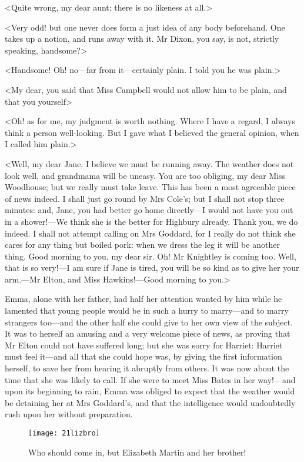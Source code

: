 <Quite wrong, my dear aunt; there is no likeness at all.>

<Very odd! but one never does form a just idea of any body beforehand. One takes up a notion, and runs away with it. Mr Dixon, you say, is not, strictly speaking, handsome?>

<Handsome! Oh! no—far from it—certainly plain. I told you he was plain.>

<My dear, you said that Miss Campbell would not allow him to be plain, and that you yourself\longdash>

<Oh! as for me, my judgment is worth nothing. Where I have a regard, I always think a person well-looking. But I gave what I believed the general opinion, when I called him plain.>

<Well, my dear Jane, I believe we must be running away. The weather does not look well, and grandmama will be uneasy. You are too obliging, my dear Miss Woodhouse; but we really must take leave. This has been a most agreeable piece of news indeed. I shall just go round by Mrs Cole's; but I shall not stop three minutes: and, Jane, you had better go home directly—I would not have you out in a shower!—We think she is the better for Highbury already. Thank you, we do indeed. I shall not attempt calling on Mrs Goddard, for I really do not think she cares for any thing but boiled pork: when we dress the leg it will be another thing. Good morning to you, my dear sir. Oh! Mr Knightley is coming too. Well, that is so very!—I am sure if Jane is tired, you will be so kind as to give her your arm.—Mr Elton, and Miss Hawkins!—Good morning to you.>

Emma, alone with her father, had half her attention wanted by him while he lamented that young people would be in such a hurry to marry—and to marry strangers too—and the other half she could give to her own view of the subject. It was to herself an amusing and a very welcome piece of news, as proving that Mr Elton could not have suffered long; but she was sorry for Harriet: Harriet must feel it—and all that she could hope was, by giving the first information herself, to save her from hearing it abruptly from others. It was now about the time that she was likely to call. If she were to meet Miss Bates in her way!—and upon its beginning to rain, Emma was obliged to expect that the weather would be detaining her at Mrs Goddard's, and that the intelligence would undoubtedly rush upon her without preparation.

\begin{figure}[tbph]
\centering
\texttt{[image: 21lizbro]}
\caption{Who should come in, but Elizabeth Martin and her brother!}
\end{figure}

